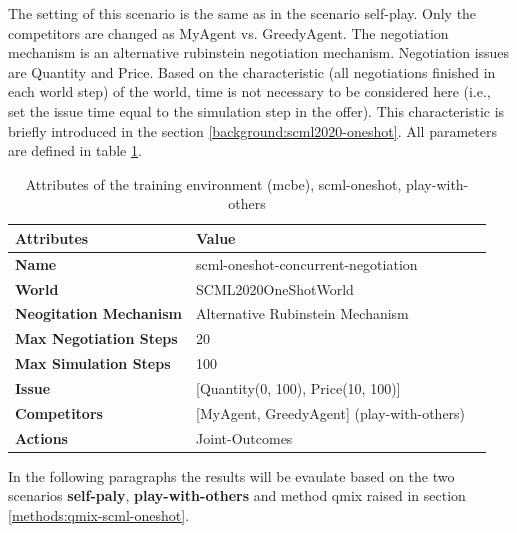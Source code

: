 The setting of this scenario is the same as in the scenario self-play. Only the competitors are changed as MyAgent vs. GreedyAgent. The negotiation mechanism is an alternative rubinstein negotiation mechanism. Negotiation issues are Quantity and Price. Based on the characteristic (all negotiations finished in each world step) of the world, time is not necessary to be considered here (i.e., set the issue time equal to the simulation step in the offer). This characteristic is briefly introduced in the section \ref{background:scml2020-oneshot}. 
All parameters are defined in table \ref{tab:attributes-mcbe-concurrent-negotiation-scml-oneshot-with-others}.

\begin{table}[htbp]
\centering
\begin{tabular}{l l l} \toprule
\bfseries \textbf{Attributes}    & \bfseries \textbf{Value}                                             \\ \midrule
\textbf{Name}                    & scml-oneshot-concurrent-negotiation                                  \\
\textbf{World}                   & SCML2020OneShotWorld                                                 \\
\textbf{Neogitation Mechanism}   & Alternative Rubinstein Mechanism                                                         \\
\textbf{Max Negotiation Steps}   & 20                                                                  \\
\textbf{Max Simulation Steps}    & 100                                                                   \\
\textbf{Issue}             	     & [Quantity(0, 100), Price(10, 100)]                     \\
\textbf{Competitors}             & [MyAgent, GreedyAgent] (play-with-others)                                       \\
\textbf{Actions}                 & Joint-Outcomes                                                             \\
\bottomrule
\end{tabular}
\caption{Attributes of the training environment (mcbe), scml-oneshot, play-with-others}
\label{tab:attributes-mcbe-concurrent-negotiation-scml-oneshot-with-others}
\end{table}

In the following paragraphs the results will be evaulate based on the two scenarios \textbf{self-paly},\textbf{ play-with-others} and method qmix raised in section \ref{methods:qmix-scml-oneshot}.


